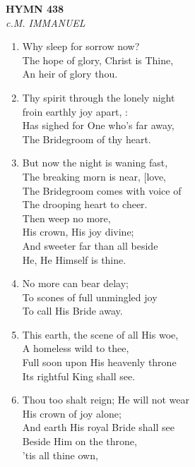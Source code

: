 \documentclass[11pt,a4paper]{article}
\begin{document}
\newpage
\begin{center}
    {\Large \textbf{HYMN 438}}
    \\
    \textit{c.M. IMMANUEL}
\end{center}
\vspace{1em}

\begin{enumerate}
    \item Why sleep for sorrow now? \\
        The hope of glory, Christ is Thine, \\
        An heir of glory thou.

    \item Thy spirit through the lonely night \\
        froin earthly joy apart, : \\
        Has sighed for One who's far away, \\
        The Bridegroom of thy heart.

    \item But now the night is waning fast, \\
        The breaking morn is near, [love, \\
        The Bridegroom comes with voice of \\
        The drooping heart to cheer. \\
        Then weep no more, \\
        His crown, His joy divine; \\
        And sweeter far than all beside \\
        He, He Himself is thine.

    \item No more can bear delay; \\
        To scones of full unmingled joy \\
        To call His Bride away.

    \item This earth, the scene of all His woe, \\
        A homeless wild to thee, \\
        Full soon upon His heavenly throne \\
        Its rightful King shall see.

    \item Thou too shalt reign; He will not wear \\
        His crown of joy alone; \\
        And earth His royal Bride shall see \\
        Beside Him on the throne, \\
        'tis all thine own,

\end{enumerate}
\end{document}
